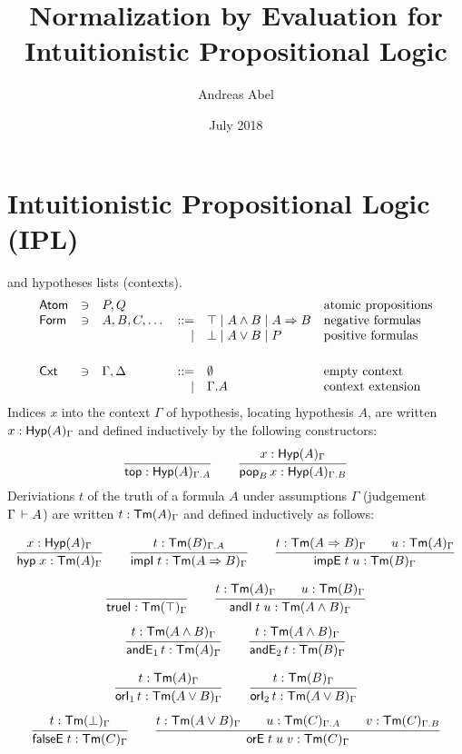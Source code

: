 \documentclass[a4paper]{article}
\title{Normalization by Evaluation for \\ Intuitionistic Propositional Logic}
\author{Andreas Abel}
\date{July 2018}
\begin{document}
\maketitle

\section{Intuitionistic Propositional Logic (IPL)}

 and hypotheses lists (contexts).
\[
\begin{array}{lllrll}
  \Atom & \ni & P,Q & & & \mbox{atomic propositions} \\
  \Form & \ni & A,B,C,\dots
     & ::= & \top \mid A \land B \mid A \imp B
       & \mbox{negative formulas} \\
     &&& \mid & \bot \mid A \lor B \mid P
       & \mbox{positive formulas} \\
\\[1ex]
  \Cxt & \ni & \Gamma,\Delta & ::= & \cempty & \mbox{empty context}
\\ &&& \mid & \Gamma.A & \mbox{context extension}
\end{array}
\]
Indices $x$ into the context $\Gamma$ of hypothesis, locating hypothesis
$A$, are written $x : \Hyp[\Gamma]A$ and defined inductively by the
following constructors:
\[
  \ru{}{\ttop : \Hyp[\Gamma.A]A}
\qquad
  \ru{x : \Hyp[\Gamma]A
    }{\pop[B] x : \Hyp[\Gamma.B]A}
\]
Deriviations $t$ of the truth of a formula $A$ under assumptions
$\Gamma$ (judgement $\Gamma \der A$)
are written $t : \Tm[\Gamma]A$ and defined inductively as follows:

\begin{gather*}
  \ru{x : \Hyp[\Gamma]A}{\hyp x : \TmG A}
\qquad
  \ru{t : \Tm[\Gamma.A]B}{\impI t : \TmG{A \imp B}}
\qquad
  \ru{t : \TmG{A \imp B} \qquad
      u : \TmG A
    }{\impE t u : \TmG B}
\end{gather*}

\begin{gather*}
  \ru{}{\trueI : \TmG\top}
\qquad
  \ru{t : \TmG A \qquad
      u : \TmG B
    }{\andI t u : \TmG{A \land B}
    }
\\[1ex]
  \ru{t : \TmG{A \land B}
    }{\andE1 t : \TmG A
    }
\qquad
  \ru{t : \TmG{A \land B}
    }{\andE2 t : \TmG B
    }
\end{gather*}

\begin{gather*}
  \ru{t : \TmG A
    }{\orI1 t : \TmG {A \lor B}
    }
\qquad
  \ru{t : \TmG B
    }{\orI2 t : \TmG {A \lor B}
    }
\\[1ex]
  \ru{t : \TmG \bot
    }{\falseE t : \TmG C}
\qquad
  \ru{t : \TmG {A \lor B} \qquad
      u : \Tm[\Gamma.A]C  \qquad
      v : \Tm[\Gamma.B]C
    }{\orE t u v : \TmG C}
\end{gather*}
\end{document}
